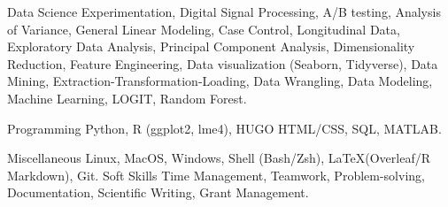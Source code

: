 

\begin{cvskills}

\cvskill
    {Data Science} %
    {Experimentation, Digital Signal Processing, A/B testing, Analysis of Variance, General Linear Modeling, Case Control, Longitudinal Data, Exploratory Data Analysis, Principal Component Analysis, Dimensionality Reduction, Feature Engineering, Data visualization (Seaborn, Tidyverse), Data Mining, Extraction-Transformation-Loading, Data Wrangling, Data Modeling, Machine Learning, LOGIT, Random Forest.} %

  \cvskill
    {Programming} %
    {Python, R (ggplot2, lme4), HUGO HTML/CSS, SQL, MATLAB.} %

  \cvskill
    {Miscellaneous} %
    {Linux, MacOS, Windows, Shell (Bash/Zsh), \LaTeX (Overleaf/R Markdown), Git.} %
  \cvskill
    {Soft Skills} %
    {Time Management, Teamwork, Problem-solving, Documentation, Scientific Writing, Grant Management.} %

\end{cvskills}
